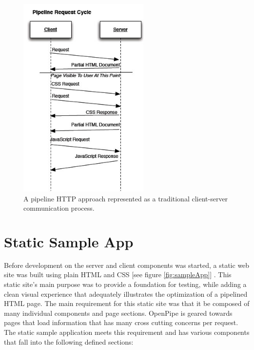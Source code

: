 \documentclass[12pt]{report}
\begin{document}
\begin{figure}[H]
\centering
\includegraphics[width=65mm]{figures/images/pipeline_request_cycle.png}
\caption{A pipeline HTTP approach represented as a traditional client-server communication process.}
\label{fig:pipelinedRequestCycle}
\end{figure}


\section{Static Sample App}
Before development on the server and client components was started, a static web site was built using plain HTML and CSS [see figure \ref{fig:sampleApp}] . This static site’s main purpose was to provide a foundation for testing, while adding a clean visual experience that adequately illustrates the optimization of a pipelined HTML page. The main requirement for this static site was that it be composed of many individual components and page sections. OpenPipe is geared towards pages that load information that has many cross cutting concerns per request. The static sample application meets this requirement and has various components that fall into the following defined sections:
\end{document}
